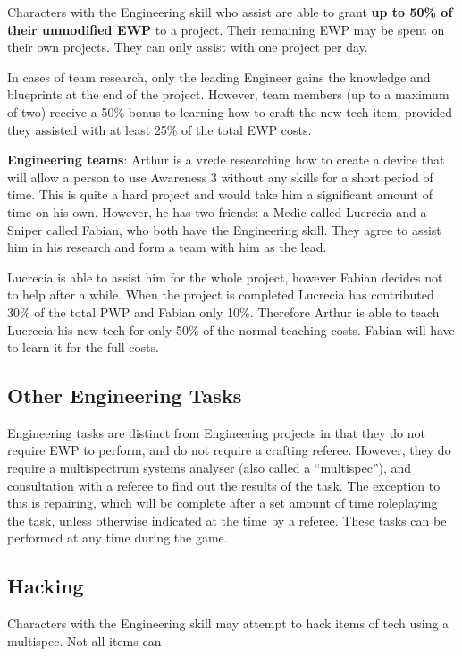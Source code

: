 \documentclass{scrbook}
\begin{document}
Characters with the Engineering skill who assist are able to grant \textbf{up to 50\% of their unmodified EWP} to a project. Their remaining EWP may be spent on their own projects. They can only assist with one project per day.

In cases of team research, only the leading Engineer gains the knowledge and blueprints at the end of the project. However, team members (up to a maximum of two) receive a 50\% bonus to learning how to craft the new tech item, provided they assisted with at least 25\% of the total EWP costs.

\textbf{Engineering teams}: Arthur is a vrede researching how to create a device that will allow a person to use Awareness 3 without any skills for a short period of time. This is quite a hard project and would take him a significant amount of time on his own. However, he has two friends: a Medic called Lucrecia and a Sniper called Fabian, who both have the Engineering skill. They agree to assist him in his research and form a team with him as the lead.

Lucrecia is able to assist him for the whole project, however Fabian decides not to help after a while. When the project is completed Lucrecia has contributed 30\% of the total PWP and Fabian only 10\%. Therefore Arthur is able to teach Lucrecia his new tech for only 50\% of the normal teaching costs. Fabian will have to learn it for the full costs.

\subsection{Other Engineering Tasks}

Engineering tasks are distinct from Engineering projects in that they do not require EWP to perform, and do not require a crafting referee. However, they do require a multispectrum systems analyser (also called a ``multispec''), and consultation with a referee to find out the results of the task. The exception to this is repairing, which will be complete after a set amount of time roleplaying the task, unless otherwise indicated at the time by a referee. These tasks can be performed at any time during the game.

\subsection{Hacking}

Characters with the Engineering skill may attempt to hack items of tech using a multispec. Not all items can
\end{document}
